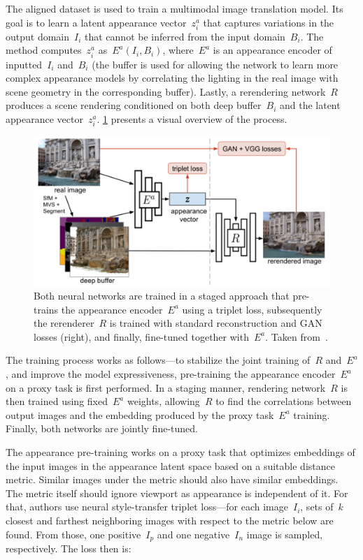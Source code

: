 The aligned dataset is used to train a multimodal image translation model. Its goal is to learn
a latent appearance vector~$z^a_i$ that captures variations in the output domain~$I_i$ that cannot be
inferred from the input domain~$B_i$. The method computes~$z^a_i$ as~$E^a(I_i, B_i)$, where~$E^a$ is
an appearance encoder of inputted~$I_i$ and~$B_i$ (the buffer is used for allowing the network to learn
more complex appearance models by correlating the lighting in the real image with scene geometry in the
corresponding buffer). Lastly, a rerendering network~$R$ produces a scene rendering conditioned
on both deep buffer~$B_i$ and the latent appearance vector~$z^a_i$. \cref{fig:nriw} presents a visual
overview of the process.

\begin{figure}
    \centering
    \includegraphics[width=.9\textwidth]{../graphics/nriw.png}
    \caption[NRIW model training]{Both neural networks are trained in a staged approach
    that pre-trains the appearance encoder~$E^a$ using a triplet loss, subsequently the
    rerenderer~$R$ is trained with standard reconstruction and GAN losses (right), and
    finally, fine-tuned together with~$E^a$. Taken from~\citet{NRIW}.}\label{fig:nriw}
\end{figure}

The training process works as follows---to stabilize the joint training of~$R$ and~$E^a$, and improve
the model expressiveness, pre-training the appearance encoder~$E^a$ on a proxy task is first performed.
In a staging manner, rendering network~$R$ is then trained using fixed~$E^a$ weights, allowing~$R$ to
find the correlations between output images and the embedding produced by the proxy task~$E^a$ training.
Finally, both networks are jointly fine-tuned.

The appearance pre-training works on a proxy task that optimizes
embeddings of the input images in the appearance latent space based on a suitable distance metric. Similar images under the metric should also have similar embeddings. The metric itself should ignore viewport as appearance is independent of it.
For that, authors use neural style-transfer triplet loss---for each image~$I_i$, sets of~$k$ closest and
farthest neighboring images with respect to the metric below are found. From those, one positive~$I_p$
and one negative~$I_n$ image is sampled, respectively. The loss then is:

